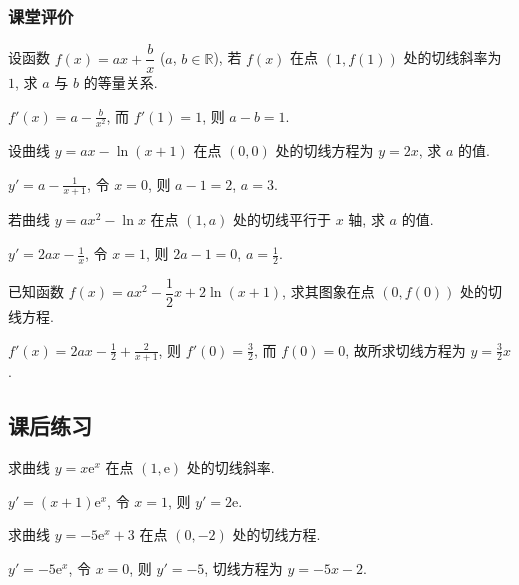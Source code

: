   \subsubsection{课堂评价}
  \begin{exercise}
    设函数 $f(x)=ax+\dfrac{b}x$ ($a$, $b\in\mathbb{R}$), 
    若 $f(x)$ 在点 $(1,f(1))$ 处的切线斜率为 $1$, 求 $a$ 与 $b$ 的等量关系.
  \end{exercise}

  \beginsolution
    $f'(x)=a-\frac{b}{x^2}$, 而 $f'(1)=1$, 则 $a-b=1$.
  \endsolution
  
  \begin{exercise}
    设曲线 $y=ax-\ln(x+1)$ 在点 $(0,0)$ 处的切线方程为 $y=2x$, 求 $a$ 的值.
  \end{exercise}

  \beginsolution
    $y'=a-\frac1{x+1}$, 令 $x=0$, 则 $a-1=2$, $a=3$.
  \endsolution
  
  \begin{exercise}
    若曲线 $y=ax^2 -\ln x$ 在点 $(1,a)$ 处的切线平行于 $x$ 轴, 求 $a$ 的值.
  \end{exercise}

  \beginsolution
    $y'=2ax-\frac1x$, 令 $x=1$, 则 $2a-1=0$, $a=\frac12$.
  \endsolution
  
  \begin{exercise}
    已知函数 $f(x)=ax^2 -\dfrac12 x+2\ln(x+1)$, 求其图象在点 $(0,f(0))$ 处的切线方程.
  \end{exercise}

  \beginsolution
    $f'(x)=2ax-\frac12+\frac2{x+1}$, 则 $f'(0)=\frac32$, 而 $f(0)=0$, 故所求切线方程为 $y=\frac32 x$.
  \endsolution
  
  \subsection{课后练习}
  \begin{exercise}
    求曲线 $y=x\mathrm{e}^x$ 在点 $(1,\mathrm{e})$ 处的切线斜率.
  \end{exercise}

  \beginsolution
    $y'=(x+1)\mathrm{e}^x$, 令 $x=1$, 则 $y'=2\mathrm{e}$.
  \endsolution
  
  \begin{exercise}
    求曲线 $y=-5\mathrm{e}^x +3$ 在点 $(0,-2)$ 处的切线方程.
  \end{exercise}

  \beginsolution
    $y'=-5\mathrm{e}^x$, 令 $x=0$, 则 $y'=-5$, 切线方程为 $y=-5x-2$.
  \endsolution
  
